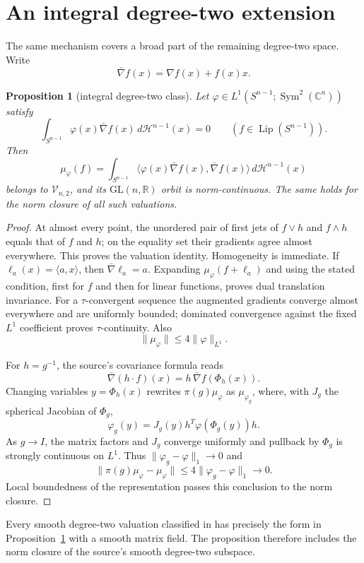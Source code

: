\documentclass[11pt]{article}
\newtheorem{proposition}[theorem]{Proposition}
\newcommand{\Lip}{\operatorname{Lip}}
\begin{document}
\section{An integral degree-two extension}

The same mechanism covers a broad part of the remaining degree-two space.
Write
\[
 \bar\nabla f(x)=\nabla f(x)+f(x)x.
\]

\begin{proposition}[integral degree-two class]\label{prop:l1}
Let $\varphi\in L^1(S^{n-1};\operatorname{Sym}^2(\mathbb C^n))$ satisfy
\[
 \int_{S^{n-1}}\varphi(x)\bar\nabla f(x)\,d\mathcal H^{n-1}(x)=0
 \qquad(f\in\Lip(S^{n-1})).
\]
Then
\[
 \mu_\varphi(f)=\int_{S^{n-1}}
 \langle\varphi(x)\bar\nabla f(x),\bar\nabla f(x)\rangle
 \,d\mathcal H^{n-1}(x)
\]
belongs to $\mathcal V_{n,2}$, and its $\mathrm{GL}(n,\mathbb R)$ orbit is
norm-continuous.  The same holds for the norm closure of all such valuations.
\end{proposition}

\begin{proof}
At almost every point, the unordered pair of first jets of $f\vee h$ and
$f\wedge h$ equals that of $f$ and $h$; on the equality set their gradients
agree almost everywhere.  This proves the valuation identity.  Homogeneity
is immediate.  If $\ell_a(x)=\langle a,x\rangle$, then
$\bar\nabla\ell_a=a$.  Expanding $\mu_\varphi(f+\ell_a)$ and using the stated
condition, first for $f$ and then for linear functions, proves dual
translation invariance.  For a $\tau$-convergent sequence the augmented
gradients converge almost everywhere and are uniformly bounded; dominated
convergence against the fixed $L^1$ coefficient proves $\tau$-continuity.  Also
\[
 \|\mu_\varphi\|\leq4\|\varphi\|_{L^1}.
\]

For $h=g^{-1}$, the source's covariance formula reads
\[
 \bar\nabla(h\mathbin{\cdot}f)(x)
 =h\,\bar\nabla f(\Phi_h(x)).
\]
Changing variables $y=\Phi_h(x)$ rewrites
$\pi(g)\mu_\varphi$ as $\mu_{\varphi_g}$, where, with $J_g$ the spherical
Jacobian of $\Phi_g$,
\[
 \varphi_g(y)=J_g(y)h^T\varphi(\Phi_g(y))h.
\]
As $g\to I$, the matrix factors and $J_g$ converge uniformly and pullback by
$\Phi_g$ is strongly continuous on $L^1$.  Thus
$\|\varphi_g-\varphi\|_1\to0$ and
\[
 \|\pi(g)\mu_\varphi-\mu_\varphi\|
 \leq4\|\varphi_g-\varphi\|_1\longrightarrow0.
\]
Local boundedness of the representation passes this conclusion to the norm
closure.
\end{proof}

Every smooth degree-two valuation classified in \cite[Theorem~3]{CKP} has
precisely the form in Proposition~\ref{prop:l1} with a smooth matrix field.
The proposition
therefore includes the norm closure of the source's smooth degree-two
subspace.
\end{document}
